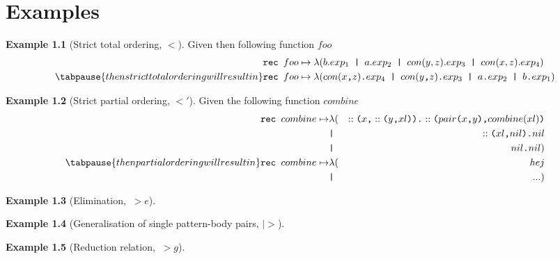 \documentclass[a4paper, oneside, draft]{memoir}
\let\fref\undefined
\theoremstyle{definition}
\newtheorem{example}{Example}
\newcommand{\patexp}[2]{#1 \texttt{.} #2}
\newcommand{\cargs}[2]{#1 \texttt{,} #2}
\newcommand{\con}[2]{#1 \texttt{(} #2 \texttt{)}}
\newcommand{\fcall}[2]{#1 \texttt{(} #2 \texttt{)}}
\begin{document}
\chapter{Examples}









\begin{example}[Strict total ordering, $<$]
  Given then following function $foo$
  \begin{eqnarray*}[rl]
    \texttt{rec } foo & \mapsto \lambda (b.exp_1 \texttt{ | } a.exp_2 \texttt{ | }
    con(y, z).exp_3 \texttt{ | } con(x, z).exp_4) \\
\tabpause{then strict total ordering will result in}
    \texttt{rec } foo & \mapsto \lambda (con(x\texttt{,} z)\texttt{.}exp_4 \texttt{ |
    } con(y\texttt{,} z)\texttt{.}exp_3 \texttt{ | } a\texttt{.}exp_2 \texttt{ | }
    b\texttt{.}exp_1)
\end{eqnarray*}
\end{example}


\begin{example}[Strict partial ordering, $<'$]
  Given the following function $combine$
  \begin{eqnarray*}[rll]
    \texttt{rec } combine \mapsto 
    & \lambda ( & \patexp{\con{::}{\cargs{x}{\con{::}{\cargs{y}{xl}}}}}{\fcall{::}{\cargs{\con{pair}{\cargs{x}{y}}}{combine(xl)}}} \\
      & \texttt{|} & \patexp{\fcall{::}{\cargs{xl}{nil}}}{nil} \\
      & \texttt{|} & \patexp{nil}{nil} )\\
\tabpause{then partial ordering will result in}
    \texttt{rec } combine \mapsto 
    & \lambda ( & hej \\
    & \texttt{|} & ... )
  \end{eqnarray*}
  

\end{example}


\begin{example}[Elimination, $~>e$]

\end{example}


\begin{example}[Generalisation of single pattern-body pairs, $|>$]

\end{example}


\begin{example}[Reduction relation, $~>g$]

\end{example}
\end{document}
